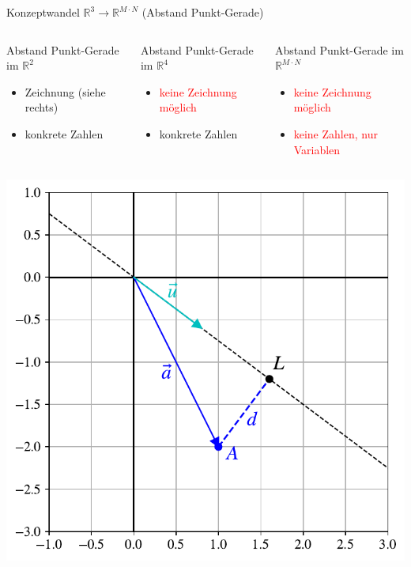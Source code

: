 \documentclass[10pt,aspectratio=169]{beamer}
\begin{document}
\begin{frame}[fragile]{Konzeptwandel $\mathbb R^3\longrightarrow\mathbb R^{M\cdot N}$ (Abstand Punkt-Gerade)}
	\begin{minipage}{0.45\textwidth}
		\begin{columns}[T,onlytextwidth]
			\column{\textwidth}
			\begin{block}{Abstand Punkt-Gerade im $\mathbb R^2$}
				\begin{itemize}
					\item Zeichnung (siehe rechts)
					\item konkrete Zahlen
				\end{itemize}
			\end{block}
			\begin{block}{Abstand Punkt-Gerade im $\mathbb R^4$}
				\begin{itemize}
					\item \textcolor{red}{keine Zeichnung möglich}
					\item konkrete Zahlen
				\end{itemize}
			\end{block}
			\begin{block}{Abstand Punkt-Gerade im $\mathbb R^{M\cdot N}$}
				\begin{itemize}
					\item \textcolor{red}{keine Zeichnung möglich}
					\item \textcolor{red}{keine Zahlen, nur Variablen}
				\end{itemize}
			\end{block}
		\end{columns}
	\end{minipage}\hfill
	\begin{minipage}{0.45\textwidth}
		\includegraphics[width=\textwidth]{images/facespace/distance_simple}
	\end{minipage}
\end{frame}
\end{document}
